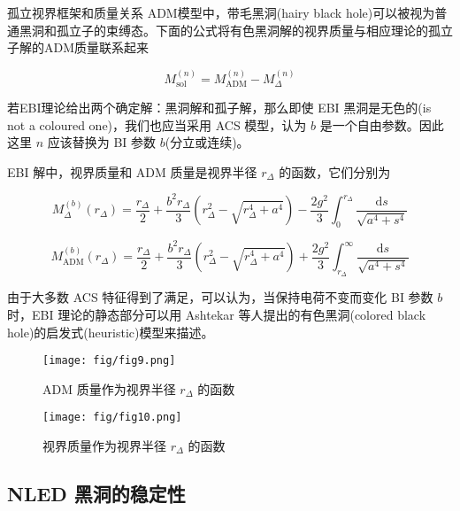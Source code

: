 \documentclass[9pt, dvipsnames]{beamer} %
\begin{document}
\begin{frame}{孤立视界框架和质量关系}
    ADM模型中，带毛黑洞(hairy black hole)可以被视为普通黑洞和孤立子的束缚态。下面的公式将有色黑洞解的视界质量与相应理论的孤立子解的ADM质量联系起来

    $$
    M_{\mathrm{sol}}^{(n)} = M_{\mathrm{ADM}}^{(n)} - M_\Delta^{(n)} 
    $$

    若EBI理论给出两个确定解：黑洞解和孤子解，那么即使 EBI 黑洞是无色的(is not a coloured one)，我们也应当采用 ACS 模型，认为 $b$ 是一个自由参数。因此这里 $n$ 应该替换为 BI 参数 $b$(分立或连续)。 

    EBI 解中，视界质量和 ADM 质量是视界半径 $r_\Delta$ 的函数，它们分别为

    $$
    M_\Delta^{(b)}(r_\Delta)
    =\frac{r_\Delta }{2 } + \frac{b^2 r_\Delta }{3 } \left(r_\Delta^2 - \sqrt{r_\Delta^4 + a^4} \right) - \frac{2g^2 }{3 } \int_0^{r_\Delta} \frac{\mathrm{d}s }{\sqrt{a^4+s^4} } 
    $$

    $$
    M_{\mathrm{ADM}}^{(b)}(r_\Delta)
    =\frac{r_\Delta }{2 } + \frac{b^2 r_\Delta }{3 } \left(r_\Delta^2 - \sqrt{r_\Delta^4 + a^4} \right) + \frac{2g^2 }{3 } \int_{r_\Delta}^{\infty} \frac{\mathrm{d}s }{\sqrt{a^4+s^4} }
    $$

    由于大多数 ACS 特征得到了满足，可以认为，当保持电荷不变而变化 BI 参数 $b$ 时，EBI 理论的静态部分可以用 Ashtekar 等人提出的有色黑洞(colored black hole)的启发式(heuristic)模型来描述。

\end{frame}

\begin{frame}
    \begin{figure}
        \centering
        \texttt{[image: fig/fig9.png]}
        \caption{ADM 质量作为视界半径 $r_\Delta$ 的函数}
    \end{figure}

    \begin{figure}
        \centering
        \texttt{[image: fig/fig10.png]}
        \caption{视界质量作为视界半径 $r_\Delta$ 的函数}
    \end{figure}
\end{frame}

\subsection{NLED 黑洞的稳定性}
\end{document}
